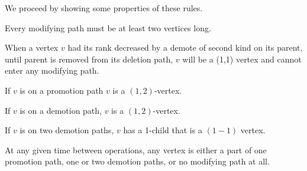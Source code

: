 We proceed by showing some properties of these rules.

\begin{obs}
Every modifying path must be at least two vertices long.
\end{obs}

\begin{obs}
When a vertex $v$ had its rank decreased by a demote of second kind on its parent, until parent is removed from its deletion path, $v$ will be a (1,1) vertex and cannot enter any modifying path. 
\end{obs}

\begin{obs}
If $v$ is on a promotion path $v$ is a $(1,2)$-vertex.
\end{obs}

\begin{obs}
If $v$ is on a demotion path, $v$ is a $(1,2)$-vertex.
\end{obs}

\begin{obs}
If $v$ is on two demotion paths, $v$ has a 1-child that is a $(1-1)$ vertex.
\end{obs}

\begin{prop}
At any given time between operations, any vertex is either a part of one promotion path, one or two demotion paths, or no modifying path at all.
\label{thm-constant-paths}
\end{prop}

